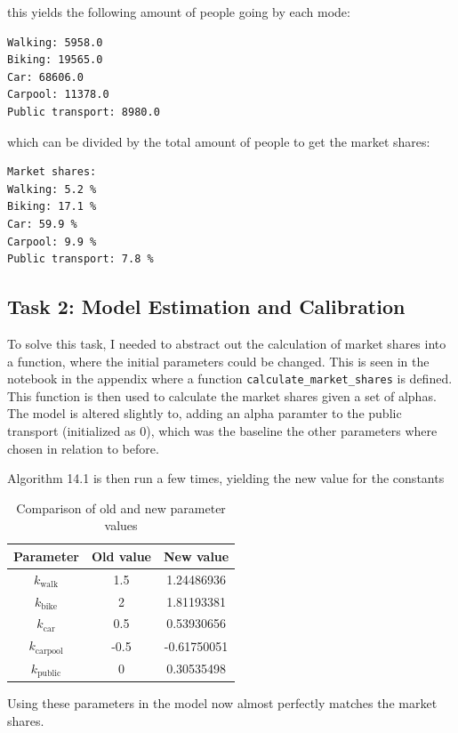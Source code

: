 \documentclass[a4paper,12pt]{article}
\begin{document}
this yields the following amount of people going by each mode:
\begin{verbatim}
Walking: 5958.0
Biking: 19565.0
Car: 68606.0
Carpool: 11378.0
Public transport: 8980.0
\end{verbatim}
which can be divided by the total amount of people to get the market shares:
\begin{verbatim}
Market shares:
Walking: 5.2 %
Biking: 17.1 %
Car: 59.9 %
Carpool: 9.9 %
Public transport: 7.8 %
\end{verbatim}

\subsection{Task 2: Model Estimation and Calibration}
To solve this task, I needed to abstract out the calculation of market shares into a function, where the initial parameters could be changed.
This is seen in the notebook in the appendix where a function \texttt{calculate\_market\_shares} is defined.
This function is then used to calculate the market shares given a set of alphas.
The model is altered slightly to, adding an alpha paramter to the public transport (initialized as $0$), which was the baseline the other parameters where chosen in relation to before.

Algorithm 14.1 is then run a few times, yielding the new value for the constants
\begin{table}[h!]
\centering
\begin{tabular}{|c|c|c|}
    \hline
    \textbf{Parameter} & \textbf{Old value} & \textbf{New value} \\
    \hline
    $k_{\text{walk}}$ & 1.5 & 1.24486936 \\
    $k_{\text{bike}}$ & 2 & 1.81193381 \\
    $k_{\text{car}}$ & 0.5 & 0.53930656 \\
    $k_{\text{carpool}}$ & -0.5 & -0.61750051 \\
    $k_{\text{public}}$ & 0 & 0.30535498 \\
    \hline
\end{tabular}
\caption{Comparison of old and new parameter values}
\label{tab:parameter_values}
\end{table}

Using these parameters in the model now almost perfectly matches the market shares.
\end{document}
